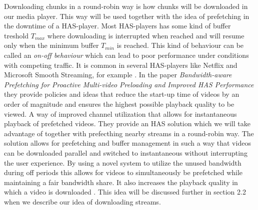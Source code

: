 \documentclass[9pt,a4paper]{acmproc}
\begin{document}
Downloading chunks in a round-robin way is how chunks will be downloaded in our media player. This way will be used together with the idea of prefetching in the downtime of a HAS-player. Most HAS-players has some kind of buffer treshold $T_{max}$ where downloading is interrupted when reached and will resume only when the minimum buffer $T_{min}$ is reached. This kind of behaviour can be called an \textit{on-off behaviour} which can lead to poor performance under conditions with competing traffic. It is common in several HAS-players like Netflix and Microsoft Smooth Streaming, for example \cite{bandawarePrefetch}. In the paper \textit{Bandwidth-aware Prefetching for Proactive Multi-video Preloading and Improved HAS Performance} they provide policies and ideas that reduce the start-up time of videos by an order of magnitude and ensures the highest possible playback quality to be viewed. A way of improved channel utilization that allows for instantaneous playback of prefetched videos. They provide an HAS solution which we will take advantage of together with prefecthing nearby streams in a round-robin way. The solution allows for prefetching and buffer management in such a way that videos can be downloaded parallel and switched to instantaneous without interrupting the user experience. By using a novel system to utilize the unused bandwidth during off periods this allows for videos to simultaneously be prefetched while maintaining a fair bandwidth share. It also increases the playback quality in which a video is downloaded \cite{bandawarePrefetch}. This idea will be discussed further in section 2.2 when we describe our idea of downloading streams.
\end{document}
